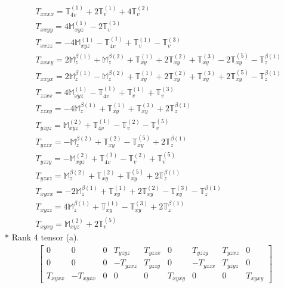\documentclass[fleqn,8pt,landscape]{jsarticle}
\begin{document}
\begin{align*}
& T_{xxxx} = \mathbb{T}_{4v}^{(1)} + 2 \mathbb{T}_{v}^{(1)} + 4 \mathbb{T}_{v}^{(2)} \\
& T_{xxyy} = 4 \mathbb{M}_{xyz}^{(1)} - 2 \mathbb{T}_{v}^{(3)} \\
& T_{xxzz} = - 4 \mathbb{M}_{xyz}^{(1)} - \mathbb{T}_{4v}^{(1)} + \mathbb{T}_{v}^{(1)} - \mathbb{T}_{v}^{(3)} \\
& T_{xxxy} = 2 \mathbb{M}_{z}^{\beta(1)} + \mathbb{M}_{z}^{\beta(2)} + \mathbb{T}_{xy}^{(1)} + 2 \mathbb{T}_{xy}^{(2)} + \mathbb{T}_{xy}^{(3)} - 2 \mathbb{T}_{xy}^{(5)} - \mathbb{T}_{z}^{\beta(1)} \\
& T_{xxyx} = 2 \mathbb{M}_{z}^{\beta(1)} - \mathbb{M}_{z}^{\beta(2)} + \mathbb{T}_{xy}^{(1)} + 2 \mathbb{T}_{xy}^{(2)} + \mathbb{T}_{xy}^{(3)} + 2 \mathbb{T}_{xy}^{(5)} - \mathbb{T}_{z}^{\beta(1)} \\
& T_{zzxx} = 4 \mathbb{M}_{xyz}^{(1)} - \mathbb{T}_{4v}^{(1)} + \mathbb{T}_{v}^{(1)} + \mathbb{T}_{v}^{(3)} \\
& T_{zzxy} = - 4 \mathbb{M}_{z}^{\beta(1)} + \mathbb{T}_{xy}^{(1)} + \mathbb{T}_{xy}^{(3)} + 2 \mathbb{T}_{z}^{\beta(1)} \\
& T_{yzyz} = \mathbb{M}_{xyz}^{(2)} + \mathbb{T}_{4v}^{(1)} - \mathbb{T}_{v}^{(2)} - \mathbb{T}_{v}^{(5)} \\
& T_{yzzx} = - \mathbb{M}_{z}^{\beta(2)} + \mathbb{T}_{xy}^{(2)} - \mathbb{T}_{xy}^{(5)} + 2 \mathbb{T}_{z}^{\beta(1)} \\
& T_{yzzy} = - \mathbb{M}_{xyz}^{(2)} + \mathbb{T}_{4v}^{(1)} - \mathbb{T}_{v}^{(2)} + \mathbb{T}_{v}^{(5)} \\
& T_{yzxz} = \mathbb{M}_{z}^{\beta(2)} + \mathbb{T}_{xy}^{(2)} + \mathbb{T}_{xy}^{(5)} + 2 \mathbb{T}_{z}^{\beta(1)} \\
& T_{xyxx} = - 2 \mathbb{M}_{z}^{\beta(1)} + \mathbb{T}_{xy}^{(1)} + 2 \mathbb{T}_{xy}^{(2)} - \mathbb{T}_{xy}^{(3)} - \mathbb{T}_{z}^{\beta(1)} \\
& T_{xyzz} = 4 \mathbb{M}_{z}^{\beta(1)} + \mathbb{T}_{xy}^{(1)} - \mathbb{T}_{xy}^{(3)} + 2 \mathbb{T}_{z}^{\beta(1)} \\
& T_{xyxy} = \mathbb{M}_{xyz}^{(2)} + 2 \mathbb{T}_{v}^{(5)}
\end{align*}
* Rank 4 tensor (a).
\begin{align*}
\begin{bmatrix} 0 & 0 & 0 & T_{yzyz} & T_{yzzx} & 0 & T_{yzzy} & T_{yzxz} & 0 \\ 0 & 0 & 0 & - T_{yzxz} & T_{yzzy} & 0 & - T_{yzzx} & T_{yzyz} & 0 \\ T_{xyxx} & - T_{xyxx} & 0 & 0 & 0 & T_{xyxy} & 0 & 0 & T_{xyxy} \end{bmatrix}
\end{align*}
\end{document}
